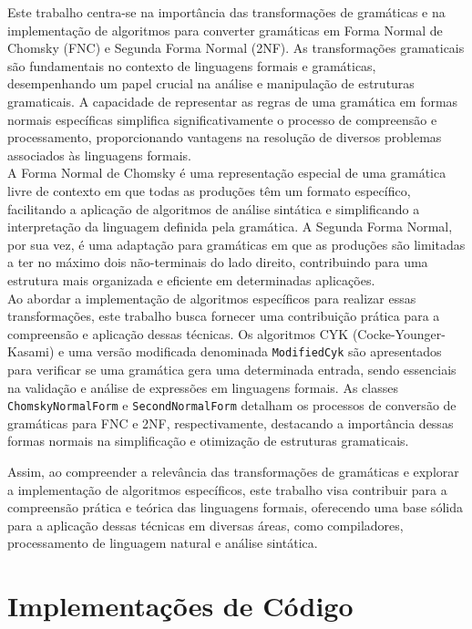 \documentclass[a4paper,12pt]{article} %
\begin{document}
Este trabalho centra-se na importância das transformações de gramáticas e na implementação de algoritmos para converter gramáticas em Forma Normal de Chomsky (FNC) e Segunda Forma Normal (2NF). As transformações gramaticais são fundamentais no contexto de linguagens formais e gramáticas, desempenhando um papel crucial na análise e manipulação de estruturas gramaticais. A capacidade de representar as regras de uma gramática em formas normais específicas simplifica significativamente o processo de compreensão e processamento, proporcionando vantagens na resolução de diversos problemas associados às linguagens formais.
\\
A Forma Normal de Chomsky é uma representação especial de uma gramática livre de contexto em que todas as produções têm um formato específico, facilitando a aplicação de algoritmos de análise sintática e simplificando a interpretação da linguagem definida pela gramática. A Segunda Forma Normal, por sua vez, é uma adaptação para gramáticas em que as produções são limitadas a ter no máximo dois não-terminais do lado direito, contribuindo para uma estrutura mais organizada e eficiente em determinadas aplicações.
\\
Ao abordar a implementação de algoritmos específicos para realizar essas transformações, este trabalho busca fornecer uma contribuição prática para a compreensão e aplicação dessas técnicas. Os algoritmos CYK (Cocke-Younger-Kasami) e uma versão modificada denominada \texttt{ModifiedCyk} são apresentados para verificar se uma gramática gera uma determinada entrada, sendo essenciais na validação e análise de expressões em linguagens formais. As classes \texttt{ChomskyNormalForm} e \texttt{SecondNormalForm} detalham os processos de conversão de gramáticas para FNC e 2NF, respectivamente, destacando a importância dessas formas normais na simplificação e otimização de estruturas gramaticais.

Assim, ao compreender a relevância das transformações de gramáticas e explorar a implementação de algoritmos específicos, este trabalho visa contribuir para a compreensão prática e teórica das linguagens formais, oferecendo uma base sólida para a aplicação dessas técnicas em diversas áreas, como compiladores, processamento de linguagem natural e análise sintática.



\section{Implementações de Código}
\end{document}
